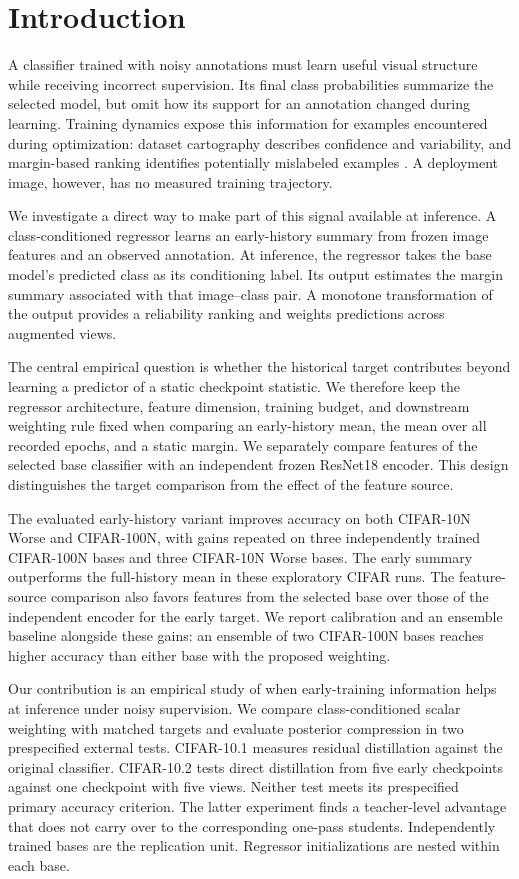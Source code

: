 \section{Introduction}
A classifier trained with noisy annotations must learn useful visual structure while receiving incorrect supervision. Its final class probabilities summarize the selected model, but omit how its support for an annotation changed during learning. Training dynamics expose this information for examples encountered during optimization: dataset cartography describes confidence and variability, and margin-based ranking identifies potentially mislabeled examples \citep{swayamdipta2020dataset,pleiss2020identifying}. A deployment image, however, has no measured training trajectory.

We investigate a direct way to make part of this signal available at inference. A class-conditioned regressor learns an early-history summary from frozen image features and an observed annotation. At inference, the regressor takes the base model's predicted class as its conditioning label. Its output estimates the margin summary associated with that image--class pair. A monotone transformation of the output provides a reliability ranking and weights predictions across augmented views.

The central empirical question is whether the historical target contributes beyond learning a predictor of a static checkpoint statistic. We therefore keep the regressor architecture, feature dimension, training budget, and downstream weighting rule fixed when comparing an early-history mean, the mean over all recorded epochs, and a static margin. We separately compare features of the selected base classifier with an independent frozen ResNet18 encoder. This design distinguishes the target comparison from the effect of the feature source.

The evaluated early-history variant improves accuracy on both CIFAR-10N Worse and CIFAR-100N, with gains repeated on three independently trained CIFAR-100N bases and three CIFAR-10N Worse bases. The early summary outperforms the full-history mean in these exploratory CIFAR runs. The feature-source comparison also favors features from the selected base over those of the independent encoder for the early target. We report calibration and an ensemble baseline alongside these gains: an ensemble of two CIFAR-100N bases reaches higher accuracy than either base with the proposed weighting.

Our contribution is an empirical study of when early-training information
helps at inference under noisy supervision. We compare class-conditioned
scalar weighting with matched targets and evaluate posterior compression
in two prespecified external tests. CIFAR-10.1 measures residual
distillation against the original classifier. CIFAR-10.2 tests direct
distillation from five early checkpoints against one checkpoint with five
views. Neither test meets its prespecified primary accuracy criterion.
The latter experiment finds a teacher-level advantage that does not carry
over to the corresponding one-pass students. Independently trained bases
are the replication unit. Regressor initializations are nested within
each base.


